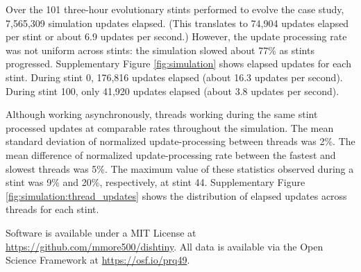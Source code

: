 Over the 101 three-hour evolutionary stints performed to evolve the case study, 7,565,309 simulation updates elapsed.
(This translates to 74,904 updates elapsed per stint or about 6.9 updates per second.)
However, the update processing rate was not uniform across stints: the simulation slowed about 77\% as stints progressed.
Supplementary Figure \ref{fig:simulation} shows elapsed updates for each stint.
During stint 0, 176,816
updates elapsed (about 16.3 updates per second).
During stint 100, only 41,920 updates elapsed (about 3.8 updates per second).

Although working asynchronously, threads working during the same stint processed updates at comparable rates throughout the simulation.
The mean standard deviation of normalized update-processing between threads was 2\%.
The mean difference of normalized update-processing rate between the fastest and slowest threads was 5\%.
The maximum value of these statistics observed during a stint was 9\% and 20\%, respectively, at stint 44.
Supplementary Figure \ref{fig:simulation:thread_updates} shows the distribution of elapsed updates across threads for each stint.

Software is available under a MIT License at \url{https://github.com/mmore500/dishtiny}.
All data is available via the Open Science Framework at \url{https://osf.io/prq49}.

